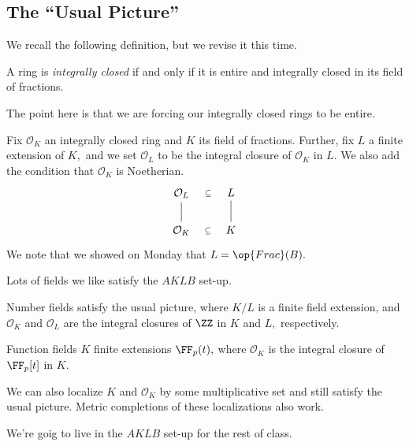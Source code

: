 \documentclass[../notes.tex]{subfiles}
\begin{document}
\subsection{The ``Usual Picture''}
We recall the following definition, but we revise it this time.
\begin{defi}
    A ring is \textit{integrally closed} if and only if it is entire and integrally closed in its field of fractions.
\end{defi}
The point here is that we are forcing our integrally closed rings to be entire.
\begin{defi}
    Fix $\mathcal O_K$ an integrally closed ring and $K$ its field of fractions. Further, fix $L$ a finite extension of $K,$ and we set $\mathcal O_L$ to be the integral closure of $\mathcal O_K$ in $L.$ We also add the condition that $\mathcal O_K$ is Noetherian.
    \[\begin{tikzcd}
    	\mathcal O_L & L \\
    	\mathcal O_K & K
    	\arrow[no head, from=2-2, to=1-2]
    	\arrow[no head, from=2-1, to=1-1]
    	\arrow["\subseteq"{description}, draw=none, from=2-1, to=2-2]
    	\arrow["\subseteq"{description}, draw=none, from=1-1, to=1-2]
    \end{tikzcd}\]
    We note that we showed on Monday that $L=\op{Frac}(B).$
\end{defi}
Lots of fields we like satisfy the $AKLB$ set-up.
\begin{ex}
    Number fields satisfy the usual picture, where $K/L$ is a finite field extension, and $\mathcal O_K$ and $\mathcal O_L$ are the integral closures of $\ZZ$ in $K$ and $L,$ respectively.
\end{ex}
\begin{ex}
    Function fields $K$ finite extensions $\FF_p(t),$ where $\mathcal O_K$ is the integral closure of $\FF_p[t]$ in $K.$
\end{ex}
\begin{ex}
    We can also localize $K$ and $\mathcal O_K$ by some multiplicative set and still satisfy the usual picture. Metric completions of these localizations also work.
\end{ex}
We're goig to live in the $AKLB$ set-up for the rest of class.
\end{document}
